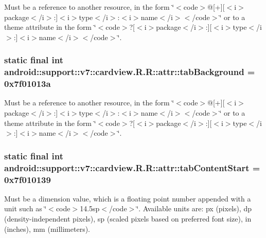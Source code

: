 Must be a reference to another resource, in the form \char`\"{}$<$code$>$@\mbox{[}+\mbox{]}\mbox{[}$<$i$>$package$<$/i$>$:\mbox{]}$<$i$>$type$<$/i$>$:$<$i$>$name$<$/i$>$$<$/code$>$\char`\"{} or to a theme attribute in the form \char`\"{}$<$code$>$?\mbox{[}$<$i$>$package$<$/i$>$:\mbox{]}\mbox{[}$<$i$>$type$<$/i$>$:\mbox{]}$<$i$>$name$<$/i$>$$<$/code$>$\char`\"{}. \hypertarget{classandroid_1_1support_1_1v7_1_1cardview_1_1_r_1_1attr_ed4c45c83cdfba289f2c1b3671dc23d9}{
\subsubsection[{tabBackground}]{\setlength{\rightskip}{0pt plus 5cm}static final int android::support::v7::cardview.R.R::attr::tabBackground = 0x7f01013a}}
\label{classandroid_1_1support_1_1v7_1_1cardview_1_1_r_1_1attr_ed4c45c83cdfba289f2c1b3671dc23d9}


Must be a reference to another resource, in the form \char`\"{}$<$code$>$@\mbox{[}+\mbox{]}\mbox{[}$<$i$>$package$<$/i$>$:\mbox{]}$<$i$>$type$<$/i$>$:$<$i$>$name$<$/i$>$$<$/code$>$\char`\"{} or to a theme attribute in the form \char`\"{}$<$code$>$?\mbox{[}$<$i$>$package$<$/i$>$:\mbox{]}\mbox{[}$<$i$>$type$<$/i$>$:\mbox{]}$<$i$>$name$<$/i$>$$<$/code$>$\char`\"{}. \hypertarget{classandroid_1_1support_1_1v7_1_1cardview_1_1_r_1_1attr_6201e7d1fa079c14ca94366d1083026c}{
\subsubsection[{tabContentStart}]{\setlength{\rightskip}{0pt plus 5cm}static final int android::support::v7::cardview.R.R::attr::tabContentStart = 0x7f010139}}
\label{classandroid_1_1support_1_1v7_1_1cardview_1_1_r_1_1attr_6201e7d1fa079c14ca94366d1083026c}


Must be a dimension value, which is a floating point number appended with a unit such as \char`\"{}$<$code$>$14.5sp$<$/code$>$\char`\"{}. Available units are: px (pixels), dp (density-independent pixels), sp (scaled pixels based on preferred font size), in (inches), mm (millimeters). 

